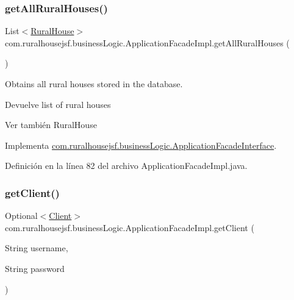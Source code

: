 \mbox{\label{classcom_1_1ruralhousejsf_1_1business_logic_1_1_application_facade_impl_a22bb7d4b98f51470315a81cd0d6f2290}} 
\subsubsection{\texorpdfstring{getAllRuralHouses()}{getAllRuralHouses()}}
{\footnotesize\ttfamily List$<$\mbox{\hyperlink{classcom_1_1ruralhousejsf_1_1domain_1_1_rural_house}{Rural\+House}}$>$ com.\+ruralhousejsf.\+business\+Logic.\+Application\+Facade\+Impl.\+get\+All\+Rural\+Houses (\begin{DoxyParamCaption}{ }\end{DoxyParamCaption})}



Obtains all rural houses stored in the database. 

\begin{DoxyReturn}{Devuelve}
list of rural houses
\end{DoxyReturn}
\begin{DoxySeeAlso}{Ver también}
Rural\+House 
\end{DoxySeeAlso}


Implementa \mbox{\hyperlink{interfacecom_1_1ruralhousejsf_1_1business_logic_1_1_application_facade_interface_aba85657d1479d51b7bf1bd17d66d0513}{com.\+ruralhousejsf.\+business\+Logic.\+Application\+Facade\+Interface}}.



Definición en la línea 82 del archivo Application\+Facade\+Impl.\+java.

\mbox{\label{classcom_1_1ruralhousejsf_1_1business_logic_1_1_application_facade_impl_a249a902aa3507a04fb15ab5fcf1f082c}} 
\subsubsection{\texorpdfstring{getClient()}{getClient()}}
{\footnotesize\ttfamily Optional$<$\mbox{\hyperlink{classcom_1_1ruralhousejsf_1_1domain_1_1_client}{Client}}$>$ com.\+ruralhousejsf.\+business\+Logic.\+Application\+Facade\+Impl.\+get\+Client (\begin{DoxyParamCaption}\item[{String}]{username,  }\item[{String}]{password }\end{DoxyParamCaption})}



